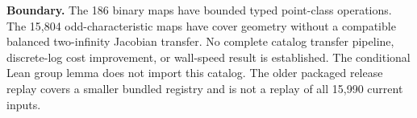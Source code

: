\documentclass[10pt]{article}
\begin{document}
\noindent\textbf{Boundary.} The 186 binary maps have bounded typed
point-class operations. The 15,804 odd-characteristic maps have cover geometry
without a compatible balanced two-infinity Jacobian transfer. No complete
catalog transfer pipeline, discrete-log cost improvement, or wall-speed result
is established. The conditional Lean group lemma does not import this catalog.
The older packaged release replay covers a smaller bundled registry and is not
a replay of all 15,990 current inputs.
\end{document}
